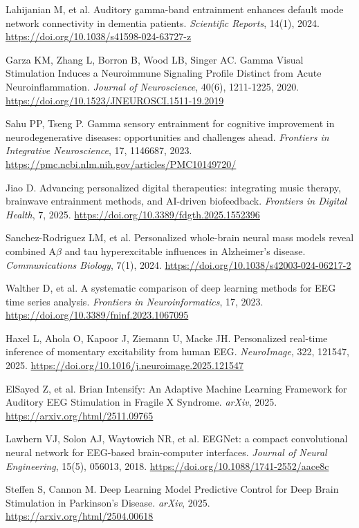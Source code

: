 \documentclass[11pt,letterpaper]{article}
\begin{document}
\begin{enumerate}[label={[\arabic*]}, leftmargin=2em, itemsep=2pt, parsep=0pt]
\item Lahijanian M, et al. Auditory gamma-band entrainment enhances default mode network connectivity in dementia patients. \textit{Scientific Reports}, 14(1), 2024. \url{https://doi.org/10.1038/s41598-024-63727-z}
\item Garza KM, Zhang L, Borron B, Wood LB, Singer AC. Gamma Visual Stimulation Induces a Neuroimmune Signaling Profile Distinct from Acute Neuroinflammation. \textit{Journal of Neuroscience}, 40(6), 1211-1225, 2020. \url{https://doi.org/10.1523/JNEUROSCI.1511-19.2019}
\item Sahu PP, Tseng P. Gamma sensory entrainment for cognitive improvement in neurodegenerative diseases: opportunities and challenges ahead. \textit{Frontiers in Integrative Neuroscience}, 17, 1146687, 2023. \url{https://pmc.ncbi.nlm.nih.gov/articles/PMC10149720/}
\item Jiao D. Advancing personalized digital therapeutics: integrating music therapy, brainwave entrainment methods, and AI-driven biofeedback. \textit{Frontiers in Digital Health}, 7, 2025. \url{https://doi.org/10.3389/fdgth.2025.1552396}
\item Sanchez-Rodriguez LM, et al. Personalized whole-brain neural mass models reveal combined A$\beta$ and tau hyperexcitable influences in Alzheimer's disease. \textit{Communications Biology}, 7(1), 2024. \url{https://doi.org/10.1038/s42003-024-06217-2}
\item Walther D, et al. A systematic comparison of deep learning methods for EEG time series analysis. \textit{Frontiers in Neuroinformatics}, 17, 2023. \url{https://doi.org/10.3389/fninf.2023.1067095}
\item Haxel L, Ahola O, Kapoor J, Ziemann U, Macke JH. Personalized real-time inference of momentary excitability from human EEG. \textit{NeuroImage}, 322, 121547, 2025. \url{https://doi.org/10.1016/j.neuroimage.2025.121547}
\item ElSayed Z, et al. Brian Intensify: An Adaptive Machine Learning Framework for Auditory EEG Stimulation in Fragile X Syndrome. \textit{arXiv}, 2025. \url{https://arxiv.org/html/2511.09765}
\item Lawhern VJ, Solon AJ, Waytowich NR, et al. EEGNet: a compact convolutional neural network for EEG-based brain-computer interfaces. \textit{Journal of Neural Engineering}, 15(5), 056013, 2018. \url{https://doi.org/10.1088/1741-2552/aace8c}
\item Steffen S, Cannon M. Deep Learning Model Predictive Control for Deep Brain Stimulation in Parkinson's Disease. \textit{arXiv}, 2025. \url{https://arxiv.org/html/2504.00618}

\end{enumerate}
\end{document}
